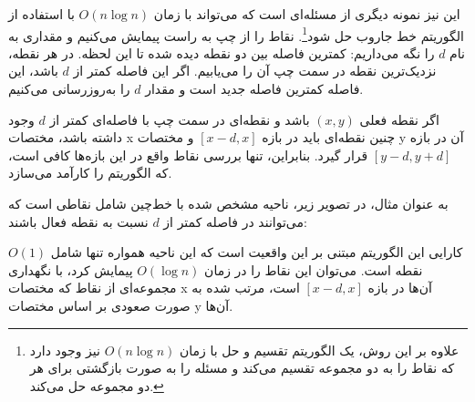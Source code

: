 این نیز نمونه دیگری از مسئله‌ای است
که می‌تواند با زمان $O(n \log n)$ با
استفاده از الگوریتم خط جاروب حل شود\footnote{علاوه بر این روش،
یک الگوریتم تقسیم و حل با زمان $O(n \log n)$ نیز وجود دارد \cite{sha75}
که نقاط را به دو مجموعه تقسیم می‌کند و مسئله را
به صورت بازگشتی برای هر دو مجموعه حل می‌کند.}.
نقاط را از چپ به راست پیمایش می‌کنیم
و مقداری به نام $d$ را نگه می‌داریم: کمترین فاصله
بین دو نقطه دیده شده تا این لحظه.
در هر نقطه، نزدیک‌ترین نقطه در سمت چپ آن را می‌یابیم.
اگر این فاصله کمتر از $d$ باشد، این فاصله کمترین فاصله
جدید است و مقدار $d$ را به‌روزرسانی می‌کنیم.

اگر نقطه فعلی $(x,y)$ باشد
و نقطه‌ای در سمت چپ با فاصله‌ای کمتر از $d$
وجود داشته باشد،
مختصات x چنین نقطه‌ای باید در بازه $[x-d,x]$
و مختصات y آن در بازه $[y-d,y+d]$ قرار گیرد.
بنابراین، تنها بررسی نقاط واقع در این بازه‌ها کافی است،
که الگوریتم را کارآمد می‌سازد.

به عنوان مثال، در تصویر زیر،
ناحیه مشخص شده با خط‌چین شامل نقاطی است
که می‌توانند در فاصله کمتر از $d$ نسبت به نقطه فعال باشند:

\begin{center}
\end{center}

کارایی این الگوریتم مبتنی بر این واقعیت است
که این ناحیه همواره تنها شامل $O(1)$ نقطه است.
می‌توان این نقاط را در زمان $O(\log n)$ پیمایش کرد،
با نگهداری مجموعه‌ای از نقاط که مختصات x آن‌ها در بازه $[x-d,x]$ است،
مرتب شده به صورت صعودی بر اساس مختصات y آن‌ها.

